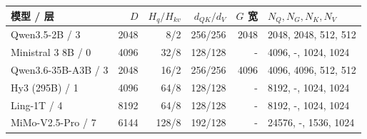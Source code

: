 \begin{tabular}{@{}lrrrrl@{}}\toprule
模型 / 层 & $D$ & $H_q/H_{kv}$ & $d_{QK}/d_V$ & $G$ 宽 & $N_Q,N_G,N_K,N_V$\\\midrule
Qwen3.5-2B / 3 & 2048 & 8/2 & 256/256 & 2048 & 2048, 2048, 512, 512\\
Ministral 3 8B / 0 & 4096 & 32/8 & 128/128 & - & 4096, -, 1024, 1024\\
Qwen3.6-35B-A3B / 3 & 2048 & 16/2 & 256/256 & 4096 & 4096, 4096, 512, 512\\
Hy3 (295B) / 1 & 4096 & 64/8 & 128/128 & - & 8192, -, 1024, 1024\\
Ling-1T / 4 & 8192 & 64/8 & 128/128 & - & 8192, -, 1024, 1024\\
MiMo-V2.5-Pro / 7 & 6144 & 128/8 & 192/128 & - & 24576, -, 1536, 1024\\
\bottomrule\end{tabular}

